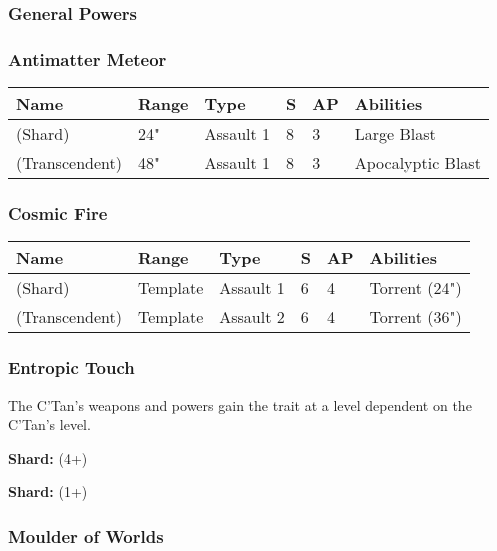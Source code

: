 \subsubsection{General Powers}

\subsubsection{Antimatter Meteor} \label{Antimatter Meteor}

\noindent
\begin{tabular}{||m{160pt} m{31pt} m{55pt} m{12pt} m{12pt} m{200pt}||}
	\hline
	Name & Range & Type & S & AP & Abilities \\
	\hline
	\quickref{Antimatter Meteor} (Shard) & 24" & Assault 1 & 8 & 3 & Large Blast \\
	\quickref{Antimatter Meteor} (Transcendent) & 48" & Assault 1 & 8 & 3 & Apocalyptic Blast \\
	\hline
\end{tabular}

\subsubsection{Cosmic Fire} \label{Cosmic Fire}

\noindent
\begin{tabular}{||m{160pt} m{31pt} m{55pt} m{12pt} m{12pt} m{200pt}||}
	\hline
	Name & Range & Type & S & AP & Abilities \\
	\hline
	\quickref{Cosmic Fire} (Shard) & Template & Assault 1 & 6 & 4 & Torrent (24") \\
	\quickref{Cosmic Fire} (Transcendent) & Template & Assault 2 & 6 & 4 & Torrent (36") \\
	\hline
\end{tabular}

\subsubsection{Entropic Touch} \label{Entropic Touch}

The C'Tan's weapons and powers gain the  trait at a level dependent on the C'Tan's level.

\textbf{Shard:}  (4+)

\textbf{Shard:}  (1+)

\subsubsection{Moulder of Worlds} \label{Moulder of Worlds}

